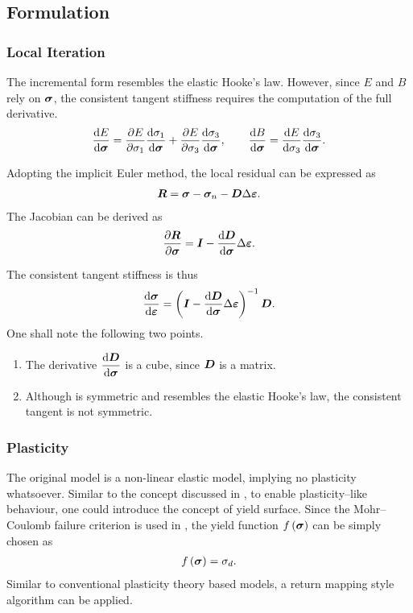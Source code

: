 \subsection{Formulation}
\subsubsection{Local Iteration}
The incremental form  resembles the elastic Hooke's law.
However, since $E$ and $B$ rely on $\bm{\sigma}$, the consistent tangent stiffness requires the computation of the full derivative.
\begin{gather}
\dfrac{\mathrm{d}E}{\mathrm{d}\bm{\sigma}}=\dfrac{\partial{E}}{\partial{\sigma_1}}\dfrac{\mathrm{d}\sigma_1}{\mathrm{d}\bm{\sigma}}+\dfrac{\partial{E}}{\partial{\sigma_3}}\dfrac{\mathrm{d}\sigma_3}{\mathrm{d}\bm{\sigma}},\qquad
\dfrac{\mathrm{d}B}{\mathrm{d}\bm{\sigma}}=\dfrac{\mathrm{d}E}{\mathrm{d}\sigma_3}\dfrac{\mathrm{d}\sigma_3}{\mathrm{d}\bm{\sigma}}.
\end{gather}

Adopting the implicit Euler method, the local residual can be expressed as
\begin{gather}
\bm{R}=\bm{\sigma}-\bm{\sigma}_n-\bm{D}\Delta\bm{\varepsilon}.
\end{gather}
The Jacobian can be derived as
\begin{gather}
\dfrac{\partial{\bm{R}}}{\partial{\bm{\sigma}}}=\bm{I}-\dfrac{\mathrm{d}\bm{D}}{\mathrm{d}\bm{\sigma}}\Delta\bm{\varepsilon}.
\end{gather}

The consistent tangent stiffness is thus
\begin{gather}
\dfrac{\mathrm{d}\bm{\sigma}}{\mathrm{d}\bm{\varepsilon}}=\left(\bm{I}-\dfrac{\mathrm{d}\bm{D}}{\mathrm{d}\bm{\sigma}}\Delta\bm{\varepsilon}\right)^{-1}\bm{D}.
\end{gather}
One shall note the following two points.
\begin{enumerate}
\item The derivative $\dfrac{\mathrm{d}\bm{D}}{\mathrm{d}\bm{\sigma}}$ is a cube, since $\bm{D}$ is a matrix.
\item Although  is symmetric and resembles the elastic Hooke's law, the consistent tangent is not symmetric.
\end{enumerate}
\subsubsection{Plasticity}
The original model is a non-linear elastic model, implying no plasticity whatsoever.
Similar to the concept discussed in \cite{Katona2015}, to enable plasticity--like behaviour, one could introduce the concept of yield surface. Since the Mohr--Coulomb failure criterion is used in , the yield function $f\left(\bm{\sigma}\right)$ can be simply chosen as
\begin{gather}
f\left(\bm{\sigma}\right)=\sigma_d.
\end{gather}
Similar to conventional plasticity theory based models, a return mapping style algorithm can be applied.

